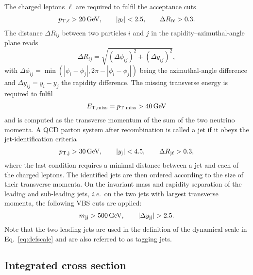 \documentclass[a4article,11pt]{article}
\begin{document}
The charged leptons $\ell$ are required to fulfil the acceptance
cuts
\begin{align}
 p_{\text{T},\ell} >  20\,\text{GeV},\qquad |y_{\ell}| < 2.5, \qquad \Delta R_{\ell\ell}> 0.3.
\end{align}
The distance $\Delta R_{ij}$ between two particles $i$ and $j$ in the rapidity--azimuthal-angle plane reads
%
\begin{equation}
        \Delta R_{ij} = \sqrt{(\Delta \phi_{ij})^2+(\Delta y_{ij})^2},
\end{equation}
%
with $\Delta \phi_{ij}=\min(|\phi_i-\phi_j|,2\pi-|\phi_i-\phi_j|)$
being the azimuthal-angle difference and $\Delta y_{ij} = y_i-y_j$ the
rapidity difference. The missing transverse energy is required to
fulfil
\begin{align}
  E_{\text{T},\text{miss}}=p_{\rm T, miss} >  40\,\text{GeV}
\end{align}
and is computed as the transverse momentum of the sum of the two
neutrino momenta. A QCD parton system after recombination is called a jet if
it obeys the jet-identification criteria
\begin{align}
 p_{\text{T},\text{j}} >  30\,\text{GeV}, \qquad |y_\text{j}| < 4.5,\qquad\Delta R_{\text{j}\ell} > 0.3,
\end{align}
where the last condition requires a minimal distance between a jet and
each of the charged leptons. The identified jets are then ordered according to the size of their transverse momenta.
On the invariant mass and rapidity separation of the 
leading and sub-leading jets, \emph{i.e.}\ on the two jets with largest
transverse momenta, the following VBS cuts are applied:
\begin{align}
\label{eq:vbscuts}
 m_{\text{j} \text{j}} >  500\,\text{GeV},\qquad |\Delta y_{\text{j} \text{j}}| > 2.5.
\end{align}
Note that the two leading jets are used in the definition of the
dynamical scale in Eq.~\eqref{eq:defscale} and are also referred to as
tagging jets.

\subsection{Integrated cross section}
\label{ssec:IntegratedCrossSection}
\end{document}
